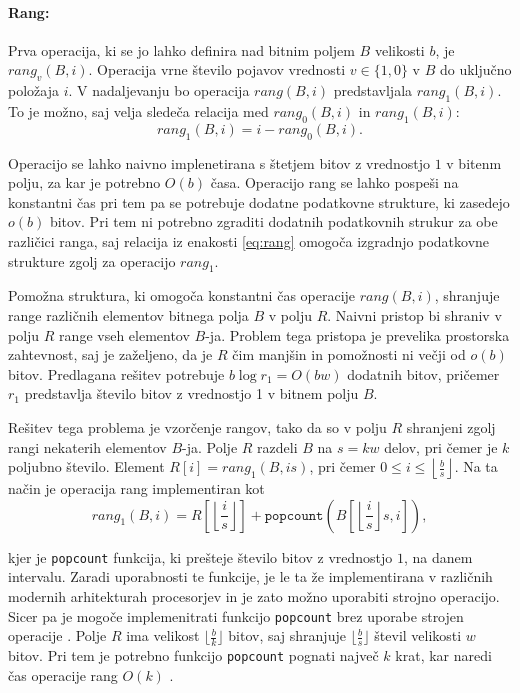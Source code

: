 \paragraph{Rang:} 
Prva operacija, ki se jo lahko definira nad bitnim poljem $B$ velikosti $b$, je $rang_v(B,i)$. Operacija vrne število pojavov vrednosti $v\in\{1,0\}$ v $B$ do uključno položaja $i$. V nadaljevanju bo operacija $rang(B,i)$ predstavljala $rang_1(B,i)$. To je možno, saj velja sledeča relacija med $rang_0(B,i)$ in $rang_1(B,i)$:
\begin{equation}\label{eq:rang}
    rang_1(B,i)=i-rang_0(B,i).
\end{equation}

Operacijo se lahko naivno implenetirana s štetjem bitov z vrednostjo $1$ v bitenm polju, za kar je potrebno $O(b)$ časa. Operacijo rang se lahko pospeši na konstantni čas pri tem pa se potrebuje dodatne podatkovne strukture, ki zasedejo $o(b)$ bitov. Pri tem ni potrebno zgraditi dodatnih podatkovnih strukur za obe različici ranga, saj relacija iz enakosti \ref{eq:rang} omogoča izgradnjo podatkovne strukture zgolj za operacijo $rang_1$.

Pomožna struktura, ki omogoča konstantni čas operacije $rang(B,i)$, shranjuje range različnih elementov bitnega polja $B$ v polju $R$. Naivni pristop bi shraniv v polju $R$ range vseh elementov $B$-ja. Problem tega pristopa je prevelika prostorska zahtevnost, saj je zaželjeno, da je $R$ čim manjšin in pomožnosti ni večji od $o(b)$ bitov. Predlagana rešitev potrebuje $b\log{r_1}=O(bw)$ dodatnih bitov, pričemer $r_1$ predstavlja število bitov z vrednostjo 1 v bitnem polju $B$.

Rešitev tega problema je vzorčenje rangov, tako da so v polju $R$ shranjeni zgolj rangi nekaterih elementov $B$-ja. Polje $R$ razdeli $B$ na $s=kw$ delov, pri čemer je $k$ poljubno število. Element $R[i]=rang_1(B,is)$, pri čemer $0\le i \le \left\lfloor\frac{b}{s} \right\rfloor$. Na ta način je operacija rang implementiran kot 
\begin{equation}
    rang_1(B,i)=R\left[\left\lfloor\frac{i}{s} \right\rfloor\right] + \texttt{popcount}\left(B\left[\left\lfloor\frac{i}{s} \right\rfloor s,i\right]\right),
\end{equation}

kjer je \texttt{popcount} funkcija, ki prešteje število bitov z vrednostjo $1$, na danem intervalu. Zaradi uporabnosti te funkcije, je le ta že implementirana v različnih modernih arhitekturah procesorjev in je zato možno uporabiti strojno operacijo. Sicer pa je mogoče implemenitrati funkcijo \texttt{popcount} brez uporabe strojen operacije \cite{Knuth2011}. Polje $R$ ima velikost $\lfloor\frac{b}{k}\rfloor$ bitov, saj shranjuje $\lfloor\frac{b}{s}\rfloor$ števil velikosti $w$ bitov. Pri tem je potrebno funkcijo \texttt{popcount} pognati največ $k$ krat, kar naredi čas operacije rang $O(k)$ \cite{Navarro2016}.

